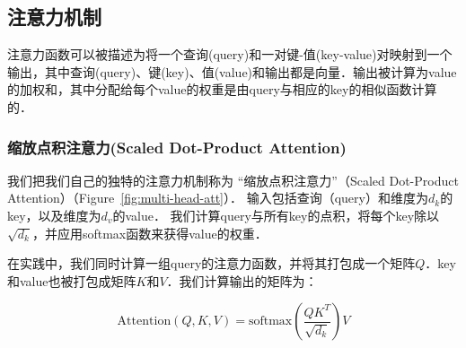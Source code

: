 \subsection{注意力机制} \label{sec:attention}

注意力函数可以被描述为将一个查询(query)和一对键-值(key-value)对映射到一个输出，其中查询(query)、键(key)、值(value)和输出都是向量．输出被计算为value的加权和，其中分配给每个value的权重是由query与相应的key的相似函数计算的．

\subsubsection{缩放点积注意力(Scaled Dot-Product Attention)} \label{sec:scaled-dot-prod}



我们把我们自己的独特的注意力机制称为 “缩放点积注意力”（Scaled Dot-Product Attention）（Figure~\ref{fig:multi-head-att}）． 输入包括查询（query）和维度为$d_k$的key，以及维度为$d_v$的value． 我们计算query与所有key的点积，将每个key除以$\sqrt{d_k}$，并应用softmax函数来获得value的权重．


在实践中，我们同时计算一组query的注意力函数，并将其打包成一个矩阵$Q$．key和value也被打包成矩阵$K$和$V$．我们计算输出的矩阵为：

\begin{equation}
   \mathrm{Attention}(Q, K, V) = \mathrm{softmax}\left(\frac{QK^T}{\sqrt{d_k}}\right)V
\end{equation}

